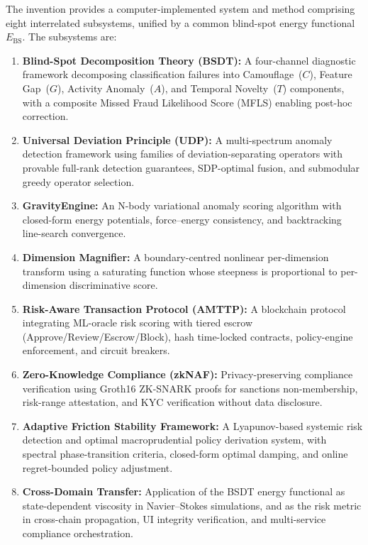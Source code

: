 \documentclass[12pt,a4paper]{article}
\begin{document}
The invention provides a computer-implemented system and method comprising
eight interrelated subsystems, unified by a common blind-spot energy functional
$E_{\mathrm{BS}}$.  The subsystems are:

\begin{enumerate}[label=(\alph*)]
\item \textbf{Blind-Spot Decomposition Theory (BSDT):} A four-channel
  diagnostic framework decomposing classification failures into Camouflage~($C$),
  Feature Gap~($G$), Activity Anomaly~($A$), and Temporal Novelty~($T$)
  components, with a composite Missed Fraud Likelihood Score (MFLS) enabling
  post-hoc correction.

\item \textbf{Universal Deviation Principle (UDP):} A multi-spectrum anomaly
  detection framework using families of deviation-separating operators with
  provable full-rank detection guarantees, SDP-optimal fusion, and submodular
  greedy operator selection.

\item \textbf{GravityEngine:} An N-body variational anomaly scoring algorithm
  with closed-form energy potentials, force--energy consistency, and
  backtracking line-search convergence.

\item \textbf{Dimension Magnifier:} A boundary-centred nonlinear per-dimension
  transform using a saturating function whose steepness is proportional to
  per-dimension discriminative score.

\item \textbf{Risk-Aware Transaction Protocol (AMTTP):} A blockchain protocol
  integrating ML-oracle risk scoring with tiered escrow
  (Approve/Review/Escrow/Block), hash time-locked contracts, policy-engine
  enforcement, and circuit breakers.

\item \textbf{Zero-Knowledge Compliance (zkNAF):} Privacy-preserving
  compliance verification using Groth16 ZK-SNARK proofs for sanctions
  non-membership, risk-range attestation, and KYC verification without data
  disclosure.

\item \textbf{Adaptive Friction Stability Framework:} A Lyapunov-based
  systemic risk detection and optimal macroprudential policy derivation system,
  with spectral phase-transition criteria, closed-form optimal damping, and
  online regret-bounded policy adjustment.

\item \textbf{Cross-Domain Transfer:} Application of the BSDT energy
  functional as state-dependent viscosity in Navier--Stokes simulations, and
  as the risk metric in cross-chain propagation, UI integrity verification,
  and multi-service compliance orchestration.
\end{enumerate}
\end{document}

